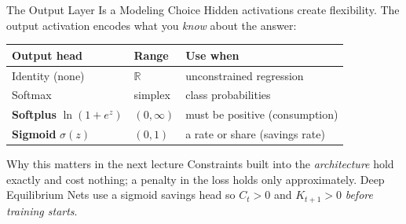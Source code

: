 \documentclass[aspectratio=169,11pt]{beamer}
\newcommand{\emphc}[1]{\textcolor{harvardcrimson}{#1}}
\newcommand{\R}{\mathbb{R}}
\begin{document}
\begin{frame}{The Output Layer Is a Modeling Choice}
Hidden activations create flexibility.  The \emphc{output} activation encodes what you \emph{know} about the answer:

\vspace{0.2cm}
\begin{center}
\begin{small}
\renewcommand{\arraystretch}{1.25}
\begin{tabular}{lll}
\toprule
\textbf{Output head} & \textbf{Range} & \textbf{Use when} \\
\midrule
Identity (none)                & $\R$         & unconstrained regression \\
Softmax                        & simplex      & class probabilities \\
\textbf{Softplus} $\ln(1+e^z)$ & $(0,\infty)$ & must be positive (consumption) \\
\textbf{Sigmoid} $\sigma(z)$   & $(0,1)$      & a rate or share (savings rate) \\
\bottomrule
\end{tabular}
\end{small}
\end{center}

\vspace{0.2cm}
\begin{exampleblock}{Why this matters in the next lecture}
\small Constraints built into the \emph{architecture} hold \emphc{exactly} and cost nothing; a penalty in the loss holds only approximately.  Deep Equilibrium Nets use a sigmoid savings head so $C_t>0$ and $K_{t+1}>0$ \emph{before training starts}.
\end{exampleblock}
\end{frame}
\end{document}

